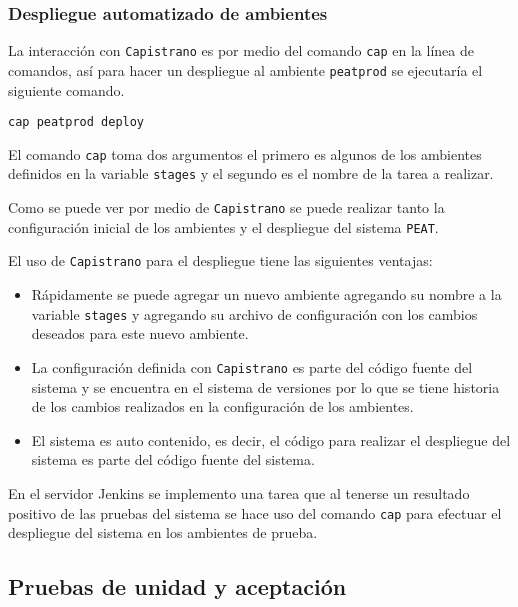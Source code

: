 \vspace{2.5mm}

\subsubsection{Despliegue automatizado de ambientes}

La interacción con \texttt{Capistrano} es por medio del comando \texttt{cap}
en la línea de comandos, así para hacer un despliegue al ambiente \texttt{peatprod}
se ejecutaría el siguiente comando.

\begin{verbatim}
cap peatprod deploy
\end{verbatim}

El comando \texttt{cap} toma dos argumentos el primero es algunos de los
ambientes definidos en la variable \texttt{stages} y el segundo es el nombre
de la tarea a realizar.

Como se puede ver por medio de \texttt{Capistrano} se puede realizar tanto
la configuración inicial de los ambientes y el despliegue del sistema \texttt{PEAT}.

El uso de \texttt{Capistrano} para el despliegue tiene las siguientes ventajas:
\begin{itemize}
\item Rápidamente se puede agregar un nuevo ambiente agregando su nombre a la
  variable \texttt{stages} y agregando su archivo de configuración con los
  cambios deseados para este nuevo ambiente.
\item La configuración definida con \texttt{Capistrano} es parte del código fuente
  del sistema y se encuentra en el sistema de versiones por lo que se tiene historia
  de los cambios realizados en la configuración de los ambientes.
\item El sistema es auto contenido, es decir, el código para realizar el despliegue
  del sistema es parte del código fuente del sistema.
\end{itemize}

En el servidor Jenkins se implemento una tarea que al tenerse un resultado
positivo de las pruebas del sistema se hace uso del comando \texttt{cap}
para efectuar el despliegue del sistema en los ambientes de prueba.

\subsection{Pruebas de unidad y aceptación}

